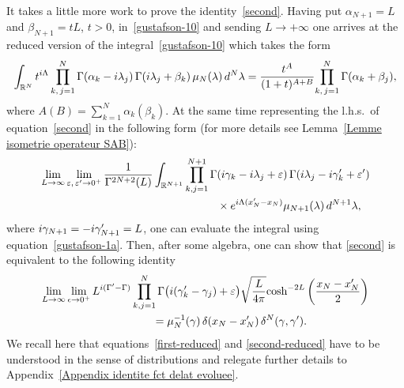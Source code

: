\documentclass[11pt]{article}
\numberwithin{equation}{section}
\numberwithin{equation}{section}
\begin{document}
It takes a little more work to prove the identity~\eqref{second}. Having put $\alpha_{N+1}=L$ and $\beta_{N+1}=t L$, $t>0$,
in~\eqref{gustafson-10} and sending $L\to +\infty$ one arrives at the reduced version of the integral~\eqref{gustafson-10} which takes the
form~\cite{DMspinchainandSL2RGustafson}
\begin{gather}\label{gustafson-1a}
\int_{\mathbb R^N} t^{{\rm i}\Lambda}
\prod_{k,\,j=1}^{N} \Gamma(\alpha_k-{\rm i}\lambda_j)\,\Gamma({\rm i}\lambda_j+\beta_k)\,
\mu_N(\lambda)\, {\rm d}^N\lambda
=\frac{t^{A}}{(1+t)^{A+B}}{\prod_{k,\,j=1}^{N}\Gamma(\alpha_k+\beta_j)},
\end{gather}
where $A(B)=\sum_{k=1}^N \alpha_k(\beta_k)$. At the same time representing the l.h.s.\ of equation~\eqref{second} in the following form (for
more details see Lemma~\ref{Lemme isometrie operateur SAB}):
\begin{gather*}
\lim_{L\rightarrow\infty} \lim_{\varepsilon,\,\varepsilon'\rightarrow 0^+} \frac1{\Gamma^{{2N+2}}(L)}\int_{\mathbb R^{N+1}}
\prod_{k,j=1}^{N+1} \Gamma({\rm i} \gamma_k-{\rm i}\lambda_j+\varepsilon)\,
\Gamma({\rm i}\lambda_j-{\rm i}\gamma'_k+\varepsilon')
\\ \hphantom{\lim_{L\rightarrow\infty} \lim_{\varepsilon,\,\varepsilon'\rightarrow 0^+} \frac1{\Gamma^{{2N+2}}(L)}\int_{\mathbb R^{N+1}}
\prod_{k,j=1}^{N+1}}
{}\times{\rm e}^{{\rm i}\Lambda(x'_N-x_N)}
\mu_{N+1}(\lambda) \,{\rm d}^{N+1}\lambda,
\end{gather*}
where ${\rm i}\gamma_{N+1}=-{\rm i}\gamma'_{N+1} =L$, one can evaluate the integral using equation~\eqref{gustafson-1a}. Then, after some algebra, one can
show that \eqref{second} is equivalent to the following identity
\begin{gather}
\lim_{L\rightarrow\infty} \lim_{\epsilon\rightarrow 0^+}
L^{{\rm i}(\Gamma'-\Gamma)}\prod_{k,j=1}^{N}\Gamma\big({\rm i}(\gamma'_k-\gamma_j)+\varepsilon\big)
\sqrt{\frac{L}{4\pi}}{\cosh^{-2L}\bigg(\frac{x_N-x'_N}2\bigg)}\nonumber
 \\ \hphantom{\lim_{L\rightarrow\infty} \lim_{\epsilon\rightarrow 0^+}}
{}= {\mu^{-1}_{N}(\gamma)}
\,\delta(x_N-x'_N)\,\delta^{N}(\gamma,\gamma').\label{second-reduced}
\end{gather}
We recall here that equations~\eqref{first-reduced} and \eqref{second-reduced} have to be understood in the sense of distributions and relegate
further details to Appendix~\ref{Appendix identite fct delat evoluee}.

\setcounter{section}{2}\setcounter{footnote}{1}
\end{document}
